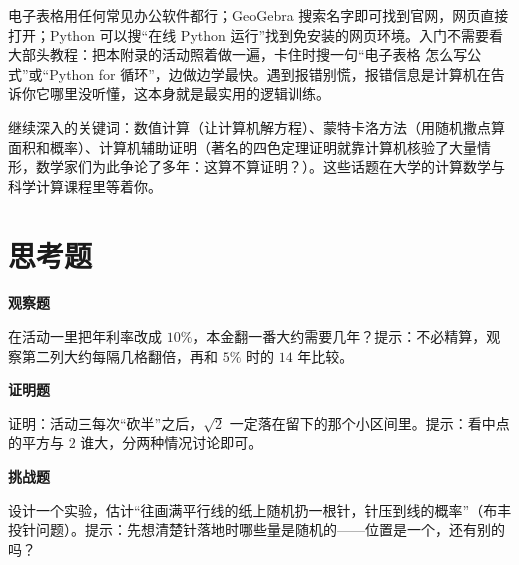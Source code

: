 电子表格用任何常见办公软件都行；GeoGebra 搜索名字即可找到官网，网页直接打开；Python 可以搜“在线 Python 运行”找到免安装的网页环境。入门不需要看大部头教程：把本附录的活动照着做一遍，卡住时搜一句“电子表格 怎么写公式”或“Python for 循环”，边做边学最快。遇到报错别慌，报错信息是计算机在告诉你它哪里没听懂，这本身就是最实用的逻辑训练。

\begin{pandeng}
继续深入的关键词：数值计算（让计算机解方程）、蒙特卡洛方法（用随机撒点算面积和概率）、计算机辅助证明（著名的四色定理证明就靠计算机核验了大量情形，数学家们为此争论了多年：这算不算证明？）。这些话题在大学的计算数学与科学计算课程里等着你。
\end{pandeng}

\section*{思考题}

\textbf{观察题}
\begin{sikao}
\item 在活动一里把年利率改成 $10\%$，本金翻一番大约需要几年？提示：不必精算，观察第二列大约每隔几格翻倍，再和 $5\%$ 时的 $14$ 年比较。
\end{sikao}

\textbf{证明题}
\begin{sikao}
\item 证明：活动三每次“砍半”之后，$\sqrt{2}$ 一定落在留下的那个小区间里。提示：看中点的平方与 $2$ 谁大，分两种情况讨论即可。
\end{sikao}

\textbf{挑战题}
\begin{sikao}
\item 设计一个实验，估计“往画满平行线的纸上随机扔一根针，针压到线的概率”（布丰投针问题）。提示：先想清楚针落地时哪些量是随机的——位置是一个，还有别的吗？
\end{sikao}
